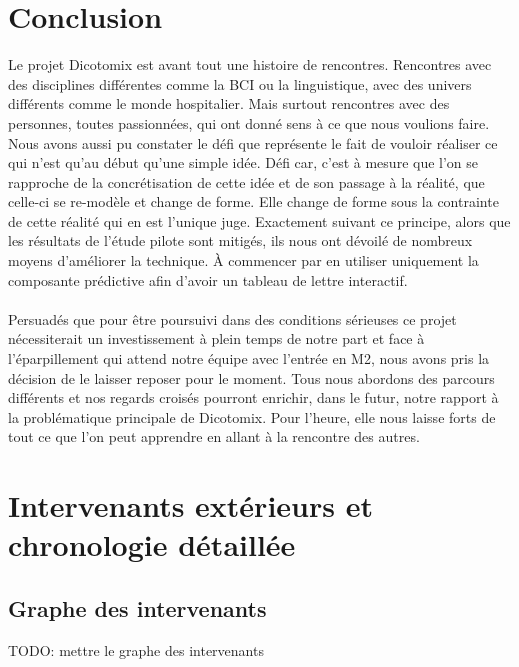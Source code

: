 \documentclass[11pt,a4paper]{article}
\theoremstyle{plain}
\theoremstyle{definition}
\begin{document}
\section{Conclusion}

Le projet Dicotomix est avant tout une histoire de rencontres. Rencontres avec des disciplines différentes comme la BCI ou la linguistique, avec des univers différents comme le monde hospitalier. 
Mais surtout rencontres avec des personnes, toutes passionnées, qui ont donné sens à ce que nous voulions faire. Nous avons aussi pu constater le défi que représente le fait de vouloir réaliser 
ce qui n'est qu'au début qu'une simple idée. Défi car, 
c'est à mesure que l'on se rapproche de la concrétisation de cette idée et de son passage à la réalité, que celle-ci se re-modèle et change de forme. Elle change de forme sous la contrainte de cette réalité
qui en est l'unique juge. Exactement suivant ce principe, alors que les résultats de l'étude pilote sont mitigés, ils nous ont dévoilé de nombreux moyens d'améliorer la technique. À commencer par en utiliser
uniquement la composante prédictive afin d'avoir un tableau de lettre interactif.
\paragraph{}Persuadés que pour être poursuivi dans des conditions sérieuses ce projet nécessiterait un investissement à plein temps de notre part et face à l'éparpillement qui attend notre équipe avec l'entrée 
en M2, nous avons pris la décision de le laisser reposer pour le moment. Tous nous abordons des parcours différents et nos regards croisés pourront enrichir, dans le futur, notre rapport 
à la problématique principale de Dicotomix. Pour l'heure, elle nous laisse forts de tout ce que l'on peut apprendre en allant à la rencontre des autres.

\appendix
\section{Intervenants extérieurs et chronologie détaillée}
\subsection{Graphe des intervenants}
TODO: mettre le graphe des intervenants
\end{document}
